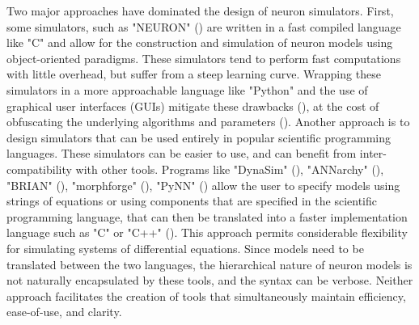 \documentclass{frontiersSCNS} %
\begin{document}
Two major approaches have dominated the design of neuron simulators. First, some simulators, such as "NEURON" (\cite{hinesNEURONSimulationEnvironment1997}) are written in a fast compiled language like "C" and allow for the construction and simulation of neuron models using object-oriented paradigms. These simulators tend to perform fast computations with little overhead, but suffer from a steep learning curve. Wrapping these simulators in a more approachable language like "Python" and the use of graphical user interfaces (GUIs) mitigate these drawbacks (\cite{hinesNEURONPython2009}), at the cost of obfuscating the underlying algorithms and parameters (\cite{bretteSimulationNetworksSpiking2007, hinesNEURONPython2009}). Another approach is to design simulators that can be used entirely in popular scientific programming languages. These simulators can be easier to use, and can benefit from inter-compatibility with other tools. Programs like "DynaSim" (\cite{sherfeyDynaSimMATLABToolbox2018}), "ANNarchy" (\cite{vitayANNarchyCodeGeneration2015}), "BRIAN" (\cite{stimbergBrianSecondComing2013}), "morphforge" (\cite{hullMorphforgeToolboxSimulating2014}), "PyNN" (\cite{davisonPyNNCommonInterface2009}) allow the user to specify models using strings of equations or using components that are specified in the scientific programming language, that can then be translated into a faster implementation language such as "C" or "C++" (\cite{stimbergEquationorientedSpecificationNeural2014}). This approach permits considerable flexibility for simulating systems of differential equations. Since models need to be translated between the two languages, the hierarchical nature of neuron models is not naturally encapsulated by these tools, and the syntax can be verbose. Neither approach facilitates the creation of tools that simultaneously maintain efficiency, ease-of-use, and clarity.
\end{document}
